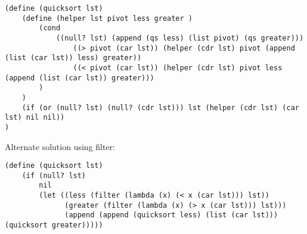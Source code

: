\begin{blocksection}

\begin{solution}[0.5in]
\begin{lstlisting}
(define (quicksort lst)
    (define (helper lst pivot less greater )
        (cond
            ((null? lst) (append (qs less) (list pivot) (qs greater)))
                ((> pivot (car lst)) (helper (cdr lst) pivot (append (list (car lst)) less) greater))
                ((< pivot (car lst)) (helper (cdr lst) pivot less (append (list (car lst)) greater)))
        )
    )
    (if (or (null? lst) (null? (cdr lst))) lst (helper (cdr lst) (car lst) nil nil))
)

\end{lstlisting}

Alternate solution using filter:

\begin{lstlisting}
(define (quicksort lst)
	(if (null? lst)
		nil
		(let ((less (filter (lambda (x) (< x (car lst))) lst))
			  (greater (filter (lambda (x) (> x (car lst))) lst)))
			  (append (append (quicksort less) (list (car lst))) (quicksort greater)))))
\end{lstlisting}

\end{solution}
\end{blocksection}
